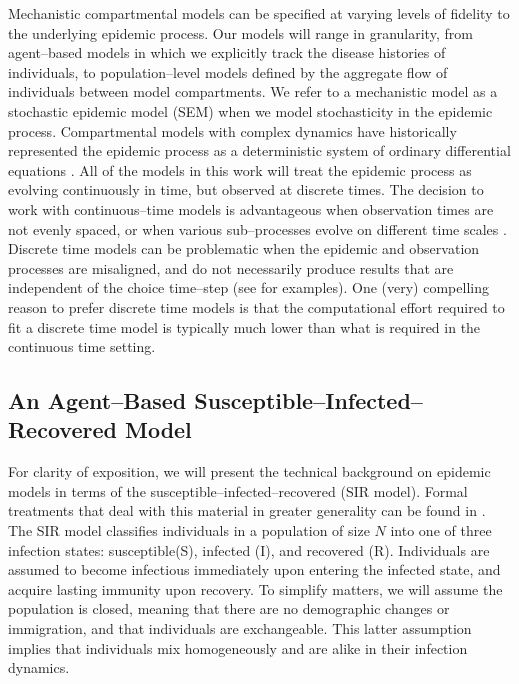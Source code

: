 Mechanistic compartmental models can be specified at varying levels of fidelity to the underlying epidemic process. Our models will range in granularity, from agent--based models in which we explicitly track the disease histories of individuals, to population--level models defined by the aggregate flow of individuals between model compartments. We refer to a mechanistic model as a stochastic epidemic model (SEM) when we model stochasticity in the epidemic process. Compartmental models with complex dynamics have historically represented the epidemic process as a deterministic system of ordinary differential equations \cite{keeling2008}. All of the models in this work will treat the epidemic process as evolving continuously in time, but observed at discrete times. The decision to work with continuous--time models is advantageous when observation times are not evenly spaced, or when various sub--processes evolve on different time scales \cite{glass2003,shelton2014}. Discrete time models can be problematic when the epidemic and observation processes are misaligned, and do not necessarily produce results that are independent of the choice time--step (see \cite{shelton2014} for examples). One (very) compelling reason to prefer discrete time models is that the computational effort required to fit a discrete time model is typically much lower than what is required in the continuous time setting. 

\subsection{An Agent--Based Susceptible--Infected--Recovered Model}
\label{subsec:sir_individual_mod}
For clarity of exposition, we will present the technical background on epidemic models in terms of the susceptible--infected--recovered (SIR model). Formal treatments that deal with this material in greater generality can be found in \cite{andersson2000stochastic,britton2018,brauer2008compartmental,fuchs2013inference,wilkinson2011stochastic}. The SIR model classifies individuals in a population of size $ N $ into one of three infection states: susceptible(S), infected (I), and recovered (R). Individuals are assumed to become infectious immediately upon entering the infected state, and acquire lasting immunity upon recovery. To simplify matters, we will assume the population is closed, meaning that there are no demographic changes or immigration, and that individuals are exchangeable. This latter assumption implies that individuals mix homogeneously and are alike in their infection dynamics. 

